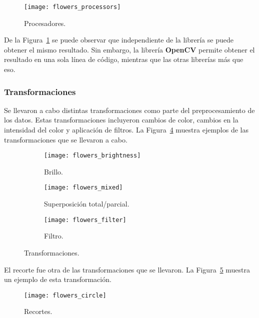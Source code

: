 \documentclass{article}
\begin{document}
\begin{figure}[h!]
  \centering
  \texttt{[image: flowers\_processors]}
  \caption{Procesadores.}
  \label{fig:flowers_processors}
\end{figure}

De la Figura~\ref{fig:flowers_processors} se puede observar que independiente de la librería se puede obtener el mismo resultado. Sin embargo, la librería \textbf{OpenCV} permite obtener el resultado en una sola línea de código, mientras que las otras librerías más que eso.

\subsubsection{Transformaciones}

Se llevaron a cabo distintas transformaciones como parte del preprocesamiento de los datos. Estas transformaciones incluyeron cambios de color, cambios en la intensidad del color y aplicación de filtros. La Figura~\ref{fig:transformaciones} muestra ejemplos de las transformaciones que se llevaron a cabo.

\begin{figure}[h!]
  \centering
  \begin{subfigure}[H]{0.3\textwidth}
    \centering
    \texttt{[image: flowers\_brightness]}
    \caption{Brillo.}
    \label{fig:flowers_brightness}
  \end{subfigure}
  \begin{subfigure}[H]{0.3\textwidth}
      \centering
      \texttt{[image: flowers\_mixed]}
      \caption{Superposición total/parcial.}
      \label{fig:flowers_mixed}
  \end{subfigure}
  \begin{subfigure}[H]{0.3\textwidth}
      \centering
      \texttt{[image: flowers\_filter]}
      \caption{Filtro.}
  \end{subfigure}
    \caption{Transformaciones.}
    \label{fig:transformaciones}
\end{figure}

El recorte fue otra de las transformaciones que se llevaron. La Figura~\ref{fig:flowers_circle} muestra un ejemplo de esta transformación.

\begin{figure}[H]
  \centering
  \texttt{[image: flowers\_circle]}
  \caption{Recortes.}
  \label{fig:flowers_circle}
\end{figure}
\end{document}
